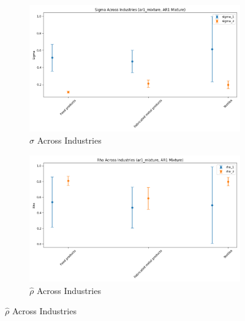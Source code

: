 \documentclass{article}
\begin{document}
\begin{figure}[ht!]
\begin{subfigure}[t]{0.32\textwidth}
        \includegraphics[width=\textwidth]{figure/ar1_mixture_sigma_across_industries.png}
        \caption{$\hat\sigma$ Across Industries}
    \end{subfigure}
    \begin{subfigure}[t]{0.32\textwidth}
        \centering
        \includegraphics[width=\textwidth]{figure/ar1_mixture_rho_across_industries.png}
        \caption{$\hat\rho$ Across Industries}
    \end{subfigure}
\end{figure}
\end{document}
